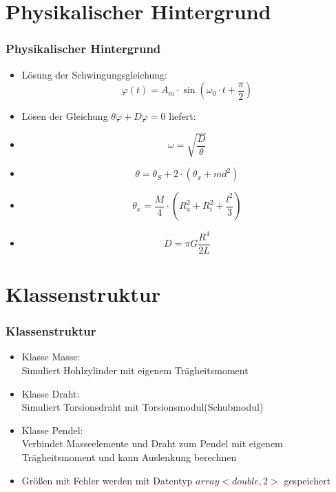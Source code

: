 \documentclass[11pt]{beamer}
\begin{document}
\section{Physikalischer Hintergrund}
\begin{frame}
\frametitle{Physikalischer Hintergrund}
\begin{itemize}
\item Lösung der Schwingungsgleichung:\\
\begin{equation}
\varphi(t)=A_m\cdot\sin{(\omega_0\cdot t+\frac{\pi}{2})}
\end{equation}
\item Lösen der Gleichung $\theta\ddot \varphi +D \varphi = 0$ liefert:
\item \begin{equation}
\omega = \sqrt{\frac{D}{\theta}}
\end{equation}
\item \begin{equation}
\theta = \theta_S +2\cdot \left(\theta_x + md^2\right)
\end{equation}
\item \begin{equation}
\theta_x = \frac{M}{4}\cdot \left(R_a^2+R_i^2+\frac{l^2}{3} \right)
\end{equation}
\item \begin{equation}
D=\pi G \frac{R^4}{2L}
\end{equation}
\end{itemize}
\end{frame}

\section{Klassenstruktur}
\begin{frame}
\frametitle{Klassenstruktur}
\begin{itemize}
\item Klasse Masse:\\Simuliert Hohlzylinder mit eigenem Trägheitsmoment
\item Klasse Draht:\\Simuliert Torsionsdraht mit Torsionsmodul(Schubmodul)
\item Klasse Pendel:\\Verbindet Masseelemente und Draht zum Pendel mit eigenem Trägheitsmoment und kann Auslenkung berechnen
\item Größen mit Fehler werden mit Datentyp $array<double, 2>$ gespeichert
\end{itemize}
\end{frame}
\end{document}
